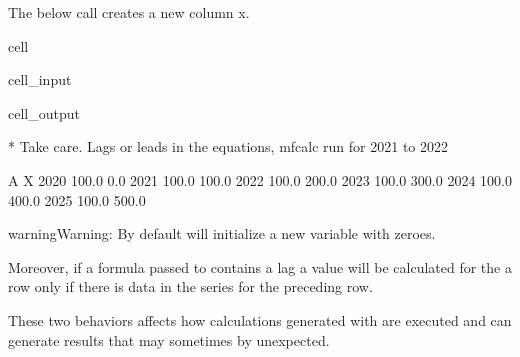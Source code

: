 \documentclass[letterpaper,10pt,english]{jupyterBook}
\begin{document}
\sphinxAtStartPar
The below call creates a new column x.

\begin{sphinxuseclass}{cell}\begin{sphinxVerbatimInput}

\begin{sphinxuseclass}{cell_input}
\begin{sphinxVerbatim}[commandchars=\\\{\}]
\end{sphinxVerbatim}

\end{sphinxuseclass}\end{sphinxVerbatimInput}
\begin{sphinxVerbatimOutput}

\begin{sphinxuseclass}{cell_output}
\begin{sphinxVerbatim}[commandchars=\\\{\}]
* Take care. Lags or leads in the equations, mfcalc run for 2021 to 2022
\end{sphinxVerbatim}

\begin{sphinxVerbatim}[commandchars=\\\{\}]
          A      X
2020  100.0    0.0
2021  100.0  100.0
2022  100.0  200.0
2023  100.0  300.0
2024  100.0  400.0
2025  100.0  500.0
\end{sphinxVerbatim}

\end{sphinxuseclass}\end{sphinxVerbatimOutput}

\end{sphinxuseclass}
\begin{sphinxadmonition}{warning}{Warning:}
\sphinxAtStartPar
By default  will initialize a new variable with zeroes.

\sphinxAtStartPar
Moreover, if a formula passed to  contains a lag a value will be calculated for the a row only if there is data in the series for the preceding row.

\sphinxAtStartPar
These two behaviors affects how calculations generated with  are executed and can generate results that may sometimes by unexpected.
\end{sphinxadmonition}
\end{document}
